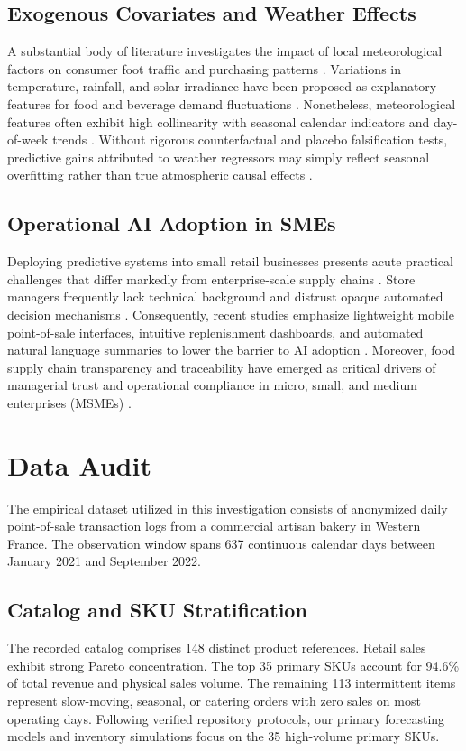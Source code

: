 \documentclass[conference]{IEEEtran}
\begin{document}
\subsection{Exogenous Covariates and Weather Effects}
A substantial body of literature investigates the impact of local meteorological factors on consumer foot traffic and purchasing patterns \cite{guler2023forecasting, lalitha2025enhanced}. Variations in temperature, rainfall, and solar irradiance have been proposed as explanatory features for food and beverage demand fluctuations \cite{jain2024weather}. Nonetheless, meteorological features often exhibit high collinearity with seasonal calendar indicators and day-of-week trends \cite{guler2023forecasting}. Without rigorous counterfactual and placebo falsification tests, predictive gains attributed to weather regressors may simply reflect seasonal overfitting rather than true atmospheric causal effects \cite{lalitha2025enhanced}.

\subsection{Operational AI Adoption in SMEs}
Deploying predictive systems into small retail businesses presents acute practical challenges that differ markedly from enterprise-scale supply chains \cite{groene2024introduction, icbir2026factors}. Store managers frequently lack technical background and distrust opaque automated decision mechanisms \cite{yuniarty2025technology}. Consequently, recent studies emphasize lightweight mobile point-of-sale interfaces, intuitive replenishment dashboards, and automated natural language summaries to lower the barrier to AI adoption \cite{icci2026mobile, icalter2024mobile, sera2025optimizing}. Moreover, food supply chain transparency and traceability have emerged as critical drivers of managerial trust and operational compliance in micro, small, and medium enterprises (MSMEs) \cite{timesicon2025technology}.

\section{Data Audit}
The empirical dataset utilized in this investigation consists of anonymized daily point-of-sale transaction logs from a commercial artisan bakery in Western France. The observation window spans 637 continuous calendar days between January 2021 and September 2022.

\subsection{Catalog and SKU Stratification}
The recorded catalog comprises 148 distinct product references. Retail sales exhibit strong Pareto concentration. The top 35 primary SKUs account for 94.6\% of total revenue and physical sales volume. The remaining 113 intermittent items represent slow-moving, seasonal, or catering orders with zero sales on most operating days. Following verified repository protocols, our primary forecasting models and inventory simulations focus on the 35 high-volume primary SKUs.
\end{document}

